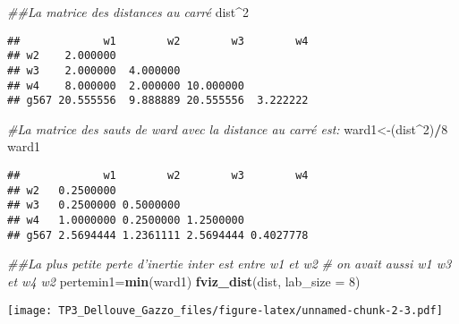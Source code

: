 \documentclass[
]{article}
\newenvironment{Shaded}{\begin{snugshade}}{\end{snugshade}}
\newcommand{\CommentTok}[1]{\textcolor[rgb]{0.56,0.35,0.01}{\textit{#1}}}
\newcommand{\DataTypeTok}[1]{\textcolor[rgb]{0.13,0.29,0.53}{#1}}
\newcommand{\DecValTok}[1]{\textcolor[rgb]{0.00,0.00,0.81}{#1}}
\newcommand{\KeywordTok}[1]{\textcolor[rgb]{0.13,0.29,0.53}{\textbf{#1}}}
\newcommand{\NormalTok}[1]{#1}
\newcommand{\OperatorTok}[1]{\textcolor[rgb]{0.81,0.36,0.00}{\textbf{#1}}}
\begin{document}
\begin{Shaded}
\begin{Highlighting}[]
\CommentTok{##La matrice des distances au carré}
\NormalTok{dist}\OperatorTok{^}\DecValTok{2}
\end{Highlighting}
\end{Shaded}

\begin{verbatim}
##             w1        w2        w3        w4
## w2    2.000000                              
## w3    2.000000  4.000000                    
## w4    8.000000  2.000000 10.000000          
## g567 20.555556  9.888889 20.555556  3.222222
\end{verbatim}

\begin{Shaded}
\begin{Highlighting}[]
\CommentTok{#La matrice des sauts de ward avec la distance au carré est:}
\NormalTok{ward1<-(dist}\OperatorTok{^}\DecValTok{2}\NormalTok{)}\OperatorTok{/}\DecValTok{8}
\NormalTok{ward1}
\end{Highlighting}
\end{Shaded}

\begin{verbatim}
##             w1        w2        w3        w4
## w2   0.2500000                              
## w3   0.2500000 0.5000000                    
## w4   1.0000000 0.2500000 1.2500000          
## g567 2.5694444 1.2361111 2.5694444 0.4027778
\end{verbatim}

\begin{Shaded}
\begin{Highlighting}[]
\CommentTok{##La plus petite perte d'inertie inter est entre w1 et w2}
\CommentTok{# on avait aussi w1 w3 et w4 w2}
\NormalTok{pertemin1=}\KeywordTok{min}\NormalTok{(ward1)}
\KeywordTok{fviz_dist}\NormalTok{(dist, }\DataTypeTok{lab_size =} \DecValTok{8}\NormalTok{)}
\end{Highlighting}
\end{Shaded}

\texttt{[image: TP3\_Dellouve\_Gazzo\_files/figure-latex/unnamed-chunk-2-3.pdf]}
\end{document}
